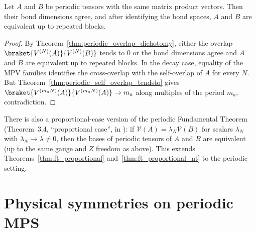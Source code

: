 \begin{theorem}
    \label{thm:peripheral_periodic_ft_proportional_same}
    \notready
    Let $A$ and $B$ be periodic tensors with the same matrix product vectors.
    Then their bond dimensions agree, and after identifying the bond spaces,
    $A$ and $B$ are equivalent up to repeated blocks.
\end{theorem}
\begin{proof}\notready
    By Theorem~\ref{thm:periodic_overlap_dichotomy}, either the overlap
    $\braket{V^{(N)}(A)}{V^{(N)}(B)}$ tends to $0$ or the bond dimensions agree
    and $A$ and $B$ are equivalent up to repeated blocks. In the decay case,
    equality of the MPV families identifies the cross-overlap with the
    self-overlap of $A$ for every $N$. But
    Theorem~\ref{thm:periodic_self_overlap_tendsto} gives
    $\braket{V^{(m_a N)}(A)}{V^{(m_a N)}(A)} \to m_a$ along multiples of the
    period $m_a$, contradiction.
\end{proof}

\begin{remark}\notready
    \label{rem:periodic_ft_proportional}
    There is also a proportional-case version of the periodic Fundamental Theorem
    (Theorem~3.4, ``proportional case'', in \cite{DeLasCuevas2017Irreducible}):
    if $\mathcal{V}(A) = \lambda_N \mathcal{V}(B)$ for scalars $\lambda_N$ with
    $\lambda_N \to \lambda \neq 0$, then the bases of periodic tensors of $A$
    and $B$ are equivalent (up to the same gauge and $Z$ freedom as above).
    This extends Theorems~\ref{thm:ft_proportional}
    and~\ref{thm:ft_proportional_nt} to the periodic setting.
\end{remark}

\section{Physical symmetries on periodic MPS}\label{sec:periodic_symmetry}

